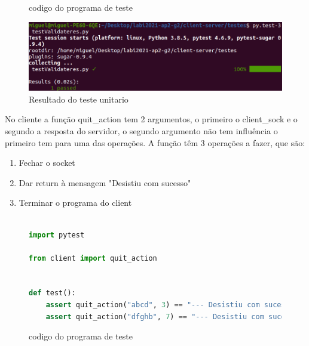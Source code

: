 \documentclass{report}
\newenvironment{changemargin}[2]{%
\begin{list}{}{%
\setlength{\topsep}{0pt}%
\setlength{\leftmargin}{#1}%
\setlength{\rightmargin}{#2}%
\setlength{\listparindent}{\parindent}%
\setlength{\itemindent}{\parindent}%
\setlength{\parsep}{\parskip}%
}%
\item[]}{\end{list}}
\theoremstyle{remark}
\begin{document}
{\begin{figure}[H]
\begin{changemargin}{-3.5cm}{-3.5cm}
\begin{tcolorbox}
\begin{lstlisting}[language=Python, inputencoding=utf8, breaklines=true, basicstyle=\small, showstringspaces=false]
\end{lstlisting}
\end{tcolorbox}
\caption{codigo do programa de teste}\label{fig:37}
\end{changemargin}
\end{figure}


\begin{figure}[H]
\begin{changemargin}{-3.5cm}{-3.5cm}
\center
\includegraphics[width = 15 cm ]{testValidateres_result.png}
\caption{Resultado do teste unitario}\label{fig:38}
\end{changemargin}
\end{figure}

No cliente a função quit\_action tem 2 argumentos, o primeiro o client\_sock e o segundo a resposta do servidor, o segundo argumento não tem influência o primeiro tem para uma das operações. A função têm 3 operações a fazer, que são:
\begin{enumerate}
  \item Fechar o socket
  \item Dar return à mensagem "Desistiu com sucesso"
  \item Terminar o programa do client
\end{enumerate}


\begin{figure}[H]
\begin{changemargin}{-3.5cm}{-3.5cm}
\begin{tcolorbox}
\begin{lstlisting}[language=Python, inputencoding=utf8, breaklines=true, basicstyle=\small, showstringspaces=false]

import pytest

from client import quit_action


def test():
	assert quit_action("abcd", 3) == "--- Desistiu com sucesso ---"
	assert quit_action("dfghb", 7) == "--- Desistiu com sucesso ---"
\end{lstlisting}
\end{tcolorbox}
\caption{codigo do programa de teste}\label{fig:39}
\end{changemargin}
\end{figure}

}
\end{document}
